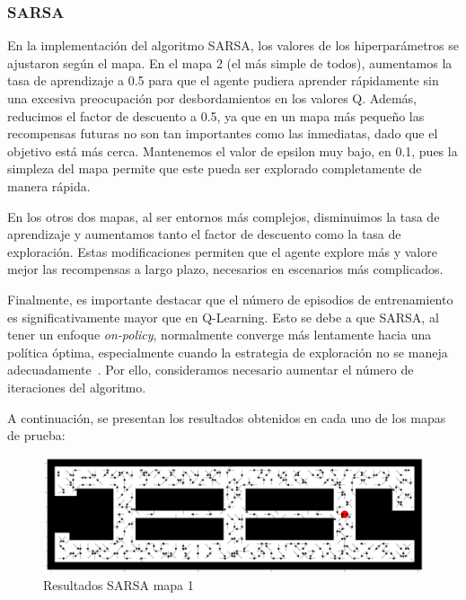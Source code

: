 \documentclass[conference,a4paper]{IEEEtran}
\begin{document}
\subsubsection{\textbf{SARSA}}

En la implementación del algoritmo SARSA, los valores de los hiperparámetros se ajustaron según el mapa. En el mapa 2 (el más simple de todos), aumentamos la tasa de aprendizaje a 0.5 para que el agente pudiera aprender rápidamente sin una excesiva preocupación por desbordamientos en los valores Q.
Además, reducimos el factor de descuento a 0.5, ya que en un mapa más pequeño las recompensas futuras no son tan importantes como las inmediatas, dado que el objetivo está más cerca.
Mantenemos el valor de epsilon muy bajo, en 0.1, pues la simpleza del mapa permite que este pueda ser explorado completamente de manera rápida.\newline

En los otros dos mapas, al ser entornos más complejos, disminuimos la tasa de aprendizaje y aumentamos tanto el factor de descuento como la tasa de exploración. Estas modificaciones permiten que el agente explore más y valore mejor las recompensas a largo plazo, necesarios en escenarios más complicados.\newline

Finalmente, es importante destacar que el número de episodios de entrenamiento es significativamente mayor que en Q-Learning. Esto se debe a que SARSA, al tener un enfoque \textit{on-policy}, normalmente converge más lentamente hacia una política óptima, especialmente cuando la estrategia de exploración no se 
maneja adecuadamente~\cite{b4}. Por ello, consideramos necesario aumentar el número de iteraciones del algoritmo.\newline

A continuación, se presentan los resultados obtenidos en cada uno de los mapas de prueba:\newline

\begin{figure}[h]
  \centering
  \includegraphics[scale=0.33]{resultado_sarsa_mapa_1}
  \caption{Resultados SARSA mapa 1}
  \label{fig:resultado_sarsa_mapa_1}
\end{figure}
\end{document}
